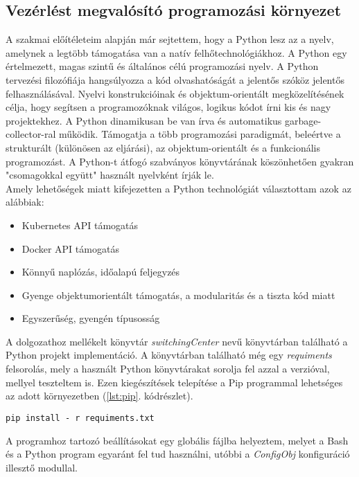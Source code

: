\subsection{Vezérlést megvalósító programozási környezet}
A szakmai előítéleteim alapján már sejtettem, hogy a Python lesz az a nyelv, amelynek a legtöbb támogatása van a natív felhőtechnológiákhoz. A Python egy értelmezett, magas szintű és általános célú programozási nyelv. A Python tervezési filozófiája hangsúlyozza a kód olvashatóságát a jelentős szóköz jelentős felhasználásával. Nyelvi konstrukcióinak és objektum-orientált megközelítésének célja, hogy segítsen a programozóknak világos, logikus kódot írni kis és nagy projektekhez. A Python dinamikusan be van írva és automatikus garbage-collector-ral működik. Támogatja a több programozási paradigmát, beleértve a strukturált (különösen az eljárási), az objektum-orientált és a funkcionális programozást. A Python-t átfogó szabványos könyvtárának köszönhetően gyakran "csomagokkal együtt" használt nyelvként írják le. \cite{pwiki} \\

\noindent
Amely lehetőségek miatt kifejezetten a Python technológiát választottam azok az alábbiak:
\begin{itemize}
	\item Kubernetes API támogatás
	\item Docker API támogatás
	\item Könnyű naplózás, időalapú feljegyzés
	\item Gyenge objektumorientált támogatás, a modularitás és a tiszta kód miatt
	\item Egyszerűség, gyengén típusosság
\end{itemize}

\noindent
A dolgozathoz mellékelt könyvtár \emph{switchingCenter} nevű könyvtárban található a Python projekt implementáció. A könyvtárban található még egy \emph{requiments} felsorolás, mely a használt Python könyvtárakat sorolja fel azzal a verzióval, mellyel teszteltem is. Ezen kiegészítések telepítése a Pip programmal lehetséges az adott környezetben (\ref{lst:pip}. kódrészlet).

\begin{lstlisting}[caption={Python könyvtárak telepítése}, label={lst:pip}]
pip install - r requiments.txt
\end{lstlisting}

\noindent
A programhoz tartozó beállításokat egy globális fájlba helyeztem, melyet a Bash és a Python program egyaránt fel tud használni, utóbbi a \emph{ConfigObj} konfiguráció illesztő modullal.

